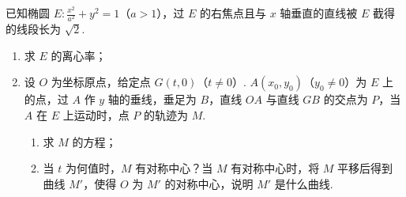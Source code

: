 \begin{problem}
已知椭圆 \(E:\frac{x^2}{a^2}+y^2=1\)（\(a>1\)），过 \(E\) 的右焦点且与 \(x\) 轴垂直的直线被 \(E\) 截得的线段长为 \(\sqrt{2}\).

\begin{enumerate}
\item 求 \(E\) 的离心率；
\item 设 \(O\) 为坐标原点，给定点 \(G\left( t,0 \right)\)（\(t\ne 0\)）. \(A\left( x_0,y_0 \right)\)（\(y_0\ne 0\)）为 \(E\) 上的点，过 \(A\) 作 \(y\) 轴的垂线，垂足为 \(B\)，直线 \(OA\) 与直线 \(GB\) 的交点为 \(P\)，当 \(A\) 在 \(E\) 上运动时，点 \(P\) 的轨迹为 \(M\).
    \begin{enumerate}
    \item 求 \(M\) 的方程；
    \item 当 \(t\) 为何值时，\(M\) 有对称中心？当 \(M\) 有对称中心时，将 \(M\) 平移后得到曲线 \(M'\)，使得 \(O\) 为 \(M'\) 的对称中心，说明 \(M'\) 是什么曲线.
    \end{enumerate}
\end{enumerate}
\end{problem}

